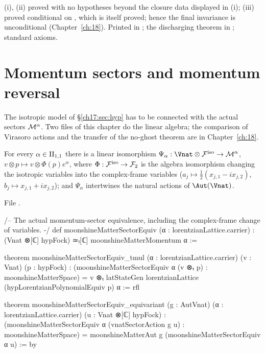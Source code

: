\begin{status}
(i), (ii) proved with no hypotheses beyond the closure data displayed in (i); (iii) proved conditional on , which is itself proved; hence the final
invariance is unconditional (Chapter~\ref{ch:18}).  Printed in ; the
discharging theorem in ; standard axioms.
\end{status}

\section{Momentum sectors and momentum reversal}\label{ch17:sec:sector}

The isotropic model of \S\ref{ch17:sec:hyp} has to be connected with the actual sectors $\mathcal{M}^\alpha$.  Two files of this
chapter do the linear algebra; the comparison of Virasoro actions and the transfer of the no-ghost theorem are in
Chapter~\ref{ch:18}.

\begin{theorem}\label{ch17:thm:sectorequiv}
For every $\alpha\in{\mathrm{II}_{1,1}}$ there is a linear isomorphism $\Psi_\alpha:\Vnat\otimes\chseventeenF^{\mathrm{iso}}\to\chseventeenM^\alpha$,
$v\otimes p\mapsto v\otimes\Phi(p)e^\alpha$, where $\Phi:\mathcal{F}^{\mathrm{iso}}\to\mathcal{F}_2$ is the algebra isomorphism changing the
isotropic variables into the complex-frame variables ($a_{j}\mapsto\frac12(x_{j,1}-ix_{j,2})$,
$b_j\mapsto x_{j,1}+ix_{j,2}$); and $\Psi_\alpha$ intertwines the natural actions of $\Aut(\Vnat)$.
\end{theorem}

\noindent File .
\begin{leancode}
/-- The actual momentum-sector equivalence, including the complex-frame change of variables. -/
def moonshineMatterSectorEquiv (α : lorentzianLattice.carrier) :
    (Vnat ⊗[ℂ] hypFock) ≃ₗ[ℂ] moonshineMatterMomentum α :=

theorem moonshineMatterSectorEquiv_tmul (α : lorentzianLattice.carrier) (v : Vnat) (p : hypFock) :
    (moonshineMatterSectorEquiv α (v ⊗ₜ p) : moonshineMatterSpace) =
      v ⊗ₜ latStateGen lorentzianLattice (hypLorentzianPolynomialEquiv p) α := rfl

theorem moonshineMatterSectorEquiv_equivariant (g : AutVnat) (α : lorentzianLattice.carrier)
    (u : Vnat ⊗[ℂ] hypFock) :
    (moonshineMatterSectorEquiv α (vnatSectorAction g u) : moonshineMatterSpace) =
      moonshineMatterAut g (moonshineMatterSectorEquiv α u) := by
\end{leancode}

